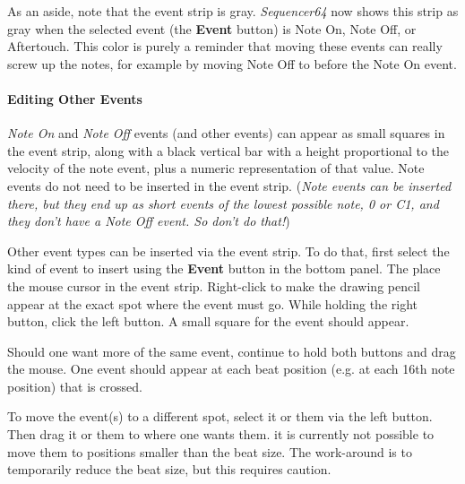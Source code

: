    As an aside, note that the event strip is gray.  \textsl{Sequencer64}
   now shows this strip as gray when the selected event (the \textbf{Event}
   button) is Note On, Note Off, or Aftertouch.  This color is purely a
   reminder that moving these events can really screw up the notes, for example
   by moving Note Off to before the Note On event.
   
\paragraph{Editing Other Events}
\label{paragraph:seq64_pattern_editor_other_events}


   \textsl{Note On} and \textsl{Note Off} events (and other events) can appear
   as small squares in the event strip, along with a black vertical bar with a
   height proportional to the velocity of the note event, plus a numeric
   representation of that value.
   Note events do not need to be inserted in the event strip.
   (\textsl{Note events can be inserted there, but they end up as short
   events of the lowest possible note, 0 or C1, and they don't have a Note
   Off event.  So don't do that!})

   Other event types can be inserted via the event strip.  To do that, first
   select the kind of event to insert using the \textbf{Event} button in the
   bottom panel.  The place the mouse cursor in the event strip.
   Right-click to make the drawing pencil appear at the exact spot where the
   event must go.  While holding the right button, click the left button.
   A small square for the event should appear.

   Should one want more of the same event, continue to hold both buttons and
   drag the mouse.  One event should appear at each beat position (e.g. at
   each 16th note position) that is crossed.

   To move the event(s) to a different spot, select it or them via the left
   button.  Then drag it or them to where one wants them.
   it is currently not possible to move them to positions smaller than the
   beat size.  The work-around is to temporarily reduce the beat size,
   but this requires caution.

